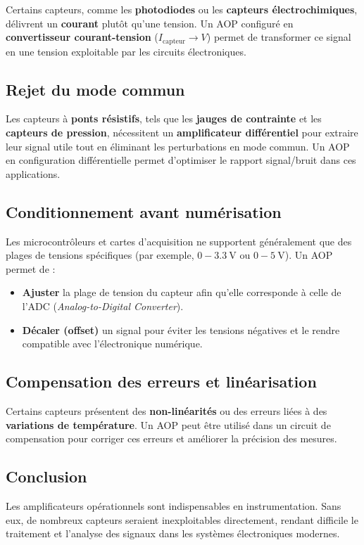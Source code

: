 Certains capteurs, comme les \textbf{photodiodes} ou les 
\textbf{capteurs électrochimiques}, délivrent un \textbf{courant} plutôt qu’une 
tension. Un AOP configuré en \textbf{convertisseur courant-tension} 
(\( I_{\text{capteur}} \rightarrow V \)) permet de transformer ce signal en une 
tension exploitable par les circuits électroniques.

\subsection{Rejet du mode commun}

Les capteurs à \textbf{ponts résistifs}, tels que les 
\textbf{jauges de contrainte} et les \textbf{capteurs de pression}, nécessitent 
un \textbf{amplificateur différentiel} pour extraire leur signal utile tout en 
éliminant les perturbations en mode commun. Un AOP en configuration 
différentielle permet d’optimiser le rapport signal/bruit dans ces applications.

\subsection{Conditionnement avant numérisation}

Les microcontrôleurs et cartes d’acquisition ne supportent généralement que des 
plages de tensions spécifiques (par exemple, \( 0 - \SI{3.3}{\volt} \) ou 
\( 0 - \SI{5}{\volt} \)). Un AOP permet de :
\begin{itemize}
    \item \textbf{Ajuster} la plage de tension du capteur afin qu’elle corresponde à celle de l’ADC (\textit{Analog-to-Digital Converter}).
    \item \textbf{Décaler (offset)} un signal pour éviter les tensions négatives et le rendre compatible avec l’électronique numérique.
\end{itemize}

\subsection{Compensation des erreurs et linéarisation}

Certains capteurs présentent des \textbf{non-linéarités} ou des erreurs liées à des \textbf{variations de température}. Un AOP peut être utilisé dans un circuit de compensation pour corriger ces erreurs et améliorer la précision des mesures.

\subsection{Conclusion}

Les amplificateurs opérationnels sont indispensables en instrumentation. Sans eux, de nombreux capteurs seraient inexploitables directement, rendant difficile le traitement et l’analyse des signaux dans les systèmes électroniques modernes.
